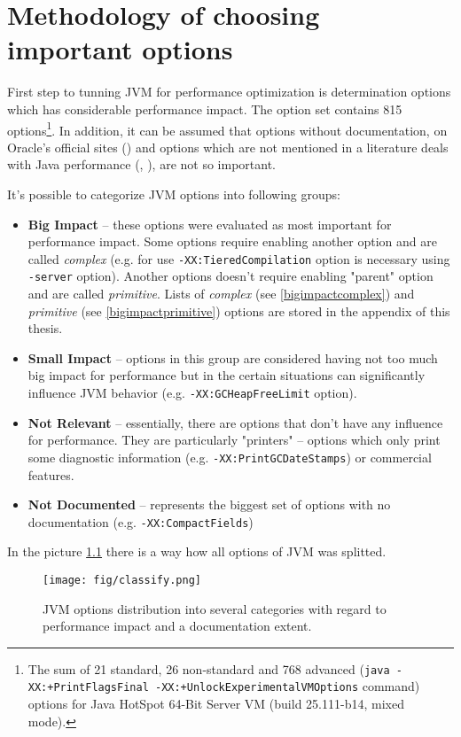 \documentclass[
  digital, %
  oneside,
  notable, %
  nolof,     %
  nolot     %
]{fithesis3}
\begin{document}
\chapter{Methodology of choosing important options}
First step to tunning JVM for performance optimization is determination options which has considerable performance impact. The option set contains 815 options\footnote{The sum of 21 standard, 26 non-standard and 768 advanced (\texttt{java -XX:+PrintFlagsFinal -XX:+UnlockExperimentalVMOptions} command) options for Java HotSpot\texttrademark{} 64-Bit Server VM (build 25.111-b14, mixed mode).}. In addition, it can be assumed that options without documentation, on Oracle's official sites (\cite{java}) and options which are not mentioned in a literature deals with Java performance (\cite{scott}, \cite{hunt}), are not so important.

It's possible to categorize JVM options into following groups:
\begin{itemize}
	\item \textbf{Big Impact} -- these options were evaluated as most important for performance impact. Some options require enabling another option and are called \textit{complex} (e.g. for use \texttt{-XX:TieredCompilation} option is necessary using \texttt{-server} option). Another options doesn't require enabling "parent" option and are called \textit{primitive}. Lists of \textit{complex} (see \ref{bigimpactcomplex}) and \textit{primitive} (see \ref{bigimpactprimitive}) options are stored in the appendix of this thesis.
	\item \textbf{Small Impact} -- options in this group are considered having not too much big impact for performance but in the certain situations can significantly influence JVM behavior (e.g. \texttt{-XX:GCHeapFreeLimit} option).
	\item \textbf{Not Relevant} -- essentially, there are options that don't have any influence for performance. They are particularly "printers" -- options which only print some diagnostic information (e.g. \texttt{-XX:PrintGCDateStamps}) or commercial features.
	\item \textbf{Not Documented} -- represents the biggest set of options with no documentation (e.g. \texttt{-XX:CompactFields})
\end{itemize}

In the picture \ref{classify} there is a way how all options of JVM was splitted.

\begin{figure}[h]
	\centering
	\texttt{[image: fig/classify.png]}
	\caption{JVM options distribution into several categories with regard to performance impact and a documentation extent.}
	\label{classify}
\end{figure}
\end{document}

